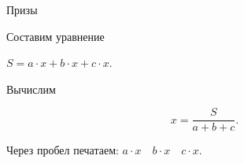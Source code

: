 \begin{tutorial}{Призы}

Составим уравнение\\
\begin {center}
$S = a \cdot x + b \cdot x + c \cdot x$.
\end{center}
Вычислим
\begin {center}
$$
x = \frac{S}{a + b + c}.
$$
\end{center}
Через пробел печатаем: $a \cdot x \quad b \cdot x \quad c \cdot x$.


\end{tutorial}
